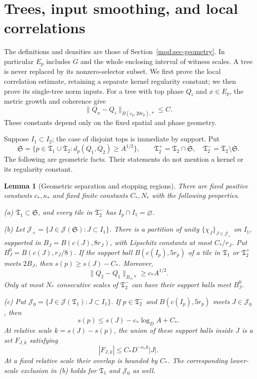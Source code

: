 \documentclass[11pt]{article}
\numberwithin{equation}{section}
\newtheorem{lemma}[theorem]{Lemma}
\theoremstyle{remark}
\theoremstyle{definition}
\newcommand{\norm}[1]{\lVert #1\rVert}
\newcommand{\TT}{\mathfrak T}
\newcommand{\cJ}{\mathcal J}
\newcommand{\cS}{\mathfrak S}
\begin{document}
\section{Trees, input smoothing, and local correlations}\label{mod:tree:mod:sec-trees}
The definitions and densities are those of Section~\ref{mod:sec-geometry}.
In particular $E_p$ includes $G$ and the whole enclosing interval of
witness scales. A tree is never replaced by its nonzero-selector subset.
We first prove the local correlation estimate, retaining a separate
kernel regularity constant; we then prove its single-tree norm inputs.
For a tree with top phase $Q_i$ and $x\in E_p$, the metric growth and
coherence give
\begin{equation}\label{mod:tree-coherence}
 \|Q_x-Q_i\|_{B(c_p,20r_p),*}\le C.
\end{equation}
These constants depend only on the fixed spatial and phase geometry.


Suppose $I_1\subset I_2$; the case of disjoint tops is immediate by support. Put
\begin{equation}\label{mod:tree:eq:high}
 \cS=\{p\in\TT_1\cup\TT_2:
 d_p(Q_1,Q_2)\ge A^{1/2}\},\qquad
 \TT_2^+=\TT_2\cap\cS,\quad \TT_2^-=\TT_2\setminus\cS.
\end{equation}
The following are geometric facts. Their statements do not mention a kernel or its regularity constant.

\begin{lemma}[Geometric separation and stopping regions]\label{mod:tree:lem:geometry}
There are fixed positive constants $c_*,\kappa_*$ and fixed finite constants $C_*,N_*$ with the following properties.

(a) $\TT_1\subset\cS$, and every tile in $\TT_2^-$ has $I_p\cap I_1=\varnothing$.

(b) Let $\cJ_+=\{J\in\cJ(\cS):J\subset I_1\}$. There is a partition of unity $\{\chi_J\}_{J\in\cJ_+}$ on $I_1$, supported in $B_J=B(c(J),8r_J)$, with Lipschitz constants at most $C_*/r_J$. Put $B_J^0=B(c(J),r_J/8)$. If the support ball $B(c(I_p),5r_p)$ of a tile in $\TT_1$ or $\TT_2^+$ meets $2B_J$, then $s(p)\ge s(J)-C_*$. Moreover,
\begin{equation}\label{mod:tree:eq:local-phase-separation}
 \norm{Q_2-Q_1}_{B_J,*}\ge c_*A^{1/2}.
\end{equation}
Only at most $N_*$ consecutive scales of $\TT_2^-$ can have their support balls meet $B_J^0$.

(c) Put $\cJ_0=\{J\in\cJ(\TT_1):J\subset I_1\}$. If $p\in\TT_2^-$ and $B(c(I_p),5r_p)$ meets $J\in\cJ_0$, then
\begin{equation}\label{mod:tree:eq:scale-gap}
 s(p)\le s(J)-c_*\log_D A+C_*.
\end{equation}
At relative scale $k=s(J)-s(p)$, the union of these support balls inside $J$ is a set $F_{J,k}$ satisfying
\begin{equation}\label{mod:tree:eq:thin}
 |F_{J,k}|\le C_*D^{-\kappa_* k}|J|.
\end{equation}
At a fixed relative scale their overlap is bounded by $C_*$. The corresponding lower-scale exclusion in (b) holds for $\TT_1$ and $\cJ_0$ as well.
\end{lemma}
\end{document}
